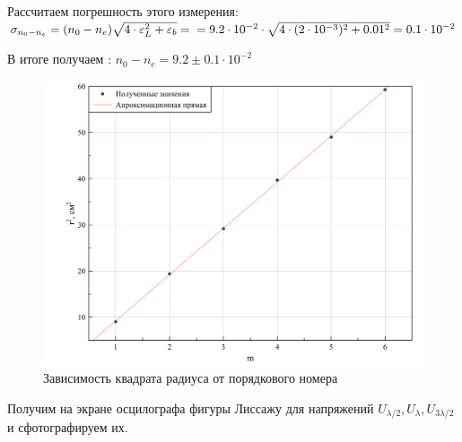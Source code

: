 \documentclass{letask}
\begin{document}
Рассчитаем погрешность этого измерения: \\$ \sigma_{n_0-n_e} = (n_0-n_e) \sqrt{4\cdot\varepsilon_L^2 + \varepsilon_b} = \\ =9.2\cdot 10^{-2} \cdot \sqrt{4\cdot (2\cdot 10^{-3})^2 + 0.01^2}  = 0.1 \cdot 10^{-2}  $

В итоге получаем : $	n_0 - n_e = 9.2 \pm 0.1 \cdot 10^{-2} $
\begin{figure}[H]
	\includegraphics[width=130mm]{graph1}
	\caption{Зависимость квадрата радиуса от порядкового номера}
\end{figure}

Получим на экране осцилографа фигуры Лиссажу для напряжений $ U_{\lambda/2}, U_\lambda, U_{3\lambda/2} $ и сфотографируем их. 
\end{document}
